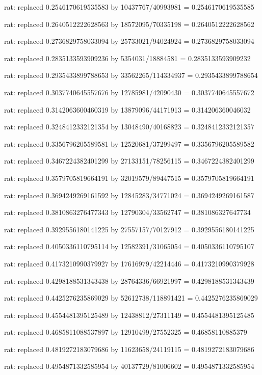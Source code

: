 \documentclass[a4paper,10pt]{article}
\begin{document}
\begin{eulernotebook}
\begin{eulercomment}
\begin{eulercomment}
\begin{eulercomment}
\begin{eulercomment}
\begin{eulercomment}
\begin{eulercomment}
\begin{eulercomment}
\begin{eulercomment}
\begin{eulercomment}
\begin{eulercomment}
\begin{eulercomment}
\begin{eulercomment}
\begin{eulercomment}
\begin{eulercomment}
\begin{eulercomment}
\begin{eulercomment}
\begin{euleroutput}
  rat: replaced 0.2546170619535583 by 10437767/40993981 = 0.2546170619535585
  
  rat: replaced 0.2640512222628563 by 18572095/70335198 = 0.2640512222628562
  
  rat: replaced 0.2736829758033094 by 25733021/94024924 = 0.2736829758033094
  
  rat: replaced 0.2835133593909236 by 5354031/18884581 = 0.2835133593909232
  
  rat: replaced 0.2935433899788653 by 33562265/114334937 = 0.2935433899788654
  
  rat: replaced 0.3037740645557676 by 12785981/42090430 = 0.3037740645557672
  
  rat: replaced 0.3142063600460319 by 13879096/44171913 = 0.314206360046032
  
  rat: replaced 0.3248412332121354 by 13048490/40168823 = 0.3248412332121357
  
  rat: replaced 0.3356796205589581 by 12520681/37299497 = 0.3356796205589582
  
  rat: replaced 0.3467224382401299 by 27133151/78256115 = 0.3467224382401299
  
  rat: replaced 0.3579705819664191 by 32019579/89447515 = 0.3579705819664191
  
  rat: replaced 0.3694249269161592 by 12845283/34771024 = 0.3694249269161587
  
  rat: replaced 0.3810863276477343 by 12790304/33562747 = 0.381086327647734
  
  rat: replaced 0.3929556180141225 by 27557157/70127912 = 0.3929556180141225
  
  rat: replaced 0.4050336110795114 by 12582391/31065054 = 0.4050336110795107
  
  rat: replaced 0.4173210990379927 by 17616979/42214446 = 0.4173210990379928
  
  rat: replaced 0.4298188531343438 by 28764336/66921997 = 0.4298188531343439
  
  rat: replaced 0.4425276235869029 by 52612738/118891421 = 0.4425276235869029
  
  rat: replaced 0.4554481395125489 by 12438812/27311149 = 0.4554481395125485
  
  rat: replaced 0.4685811088537897 by 12910499/27552325 = 0.46858110885379
  
  rat: replaced 0.4819272183079686 by 11623658/24119115 = 0.4819272183079686
  
  rat: replaced 0.4954871332585954 by 40137729/81006602 = 0.4954871332585954
  

\end{euleroutput}
\end{eulercomment}
\end{eulercomment}
\end{eulercomment}
\end{eulercomment}
\end{eulercomment}
\end{eulercomment}
\end{eulercomment}
\end{eulercomment}
\end{eulercomment}
\end{eulercomment}
\end{eulercomment}
\end{eulercomment}
\end{eulercomment}
\end{eulercomment}
\end{eulercomment}
\end{eulercomment}
\end{eulernotebook}
\end{document}
